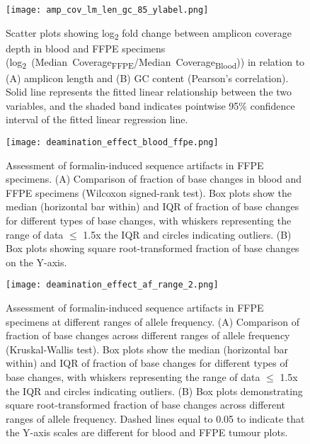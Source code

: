 \documentclass{bmcart}
\begin{document}
\begin{backmatter}
\begin{figure}[!h]
	\centering
  \texttt{[image: amp\_cov\_lm\_len\_gc\_85\_ylabel.png]}
	\caption[Scatter plots showing log\textsubscript{2} fold change between amplicon coverage depth in blood and FFPE specimens in relation to (A) amplicon length and (B) GC content (Pearson's correlation).]{Scatter plots showing log\textsubscript{2} fold change between amplicon coverage depth in blood and FFPE specimens (\mbox{log\textsubscript{2} (Median Coverage\textsubscript{FFPE}/Median Coverage\textsubscript{Blood})}) in relation to (A) amplicon length and (B) GC content (Pearson's correlation). Solid line represents the fitted linear relationship between the two variables, and the shaded band indicates pointwise 95\% confidence interval of the fitted linear regression line.}
	\label{amp_cov_lm_len_gc}
\end{figure}

\begin{figure}[!h]
	\centering
	\texttt{[image: deamination\_effect\_blood\_ffpe.png]}
	\caption[Assessment of formalin-induced sequence artifacts in FFPE specimens.]{Assessment of formalin-induced sequence artifacts in FFPE specimens. (A) Comparison of fraction of base changes in blood and FFPE specimens (Wilcoxon signed-rank test). Box plots show the median (horizontal bar within) and IQR of fraction of base changes for different types of base changes, with whiskers representing the range of data $\leq$ 1.5x the IQR and circles indicating outliers. (B) Box plots showing square root-transformed fraction of base changes on the Y-axis.}
	\label{deamination_effect_blood_ffpe}
\end{figure}

\begin{figure}[!h]
	\centering
	\texttt{[image: deamination\_effect\_af\_range\_2.png]}
  \caption[Assessment of formalin-induced sequence artifacts in FFPE specimens at different ranges of allele frequency.]{Assessment of formalin-induced sequence artifacts in FFPE specimens at different ranges of allele frequency. (A) Comparison of fraction of base changes across different ranges of allele frequency (Kruskal-Wallis test). Box plots show the median (horizontal bar within) and IQR of fraction of base changes for different types of base changes, with whiskers representing the range of data $\leq$ 1.5x the IQR and circles indicating outliers. (B) Box plots demonstrating square root-transformed fraction of base changes across different ranges of allele frequency. Dashed lines equal to 0.05 to indicate that the Y-axis scales are different for blood and FFPE tumour plots.}
	\label{deamination_effect_af_range}
\end{figure}


\end{backmatter}
\end{document}
